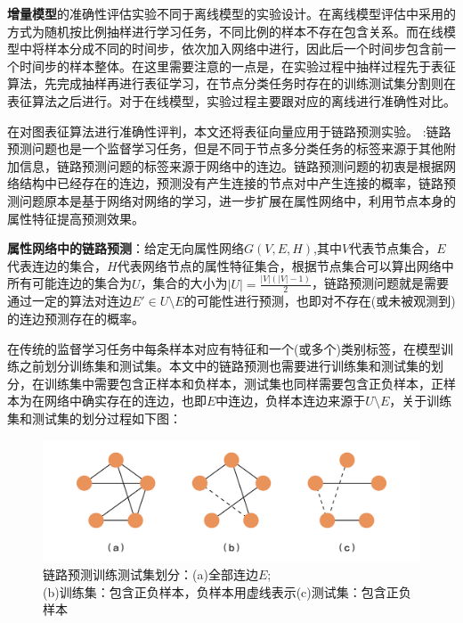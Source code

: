 \textbf{增量模型}的准确性评估实验不同于离线模型的实验设计。在离线模型评估中采用的方式为随机按比例抽样进行学习任务，不同比例的样本不存在包含关系。而在线模型中将样本分成不同的时间步，依次加入网络中进行，因此后一个时间步包含前一个时间步的样本整体。在这里需要注意的一点是，在实验过程中抽样过程先于表征算法，先完成抽样再进行表征学习，在节点分类任务时存在的训练测试集分割则在表征算法之后进行。对于在线模型，实验过程主要跟对应的离线进行准确性对比。

在对图表征算法进行准确性评判，本文还将表征向量应用于链路预测实验。
:链路预测问题也是一个监督学习任务，但是不同于节点多分类任务的标签来源于其他附加信息，链路预测问题的标签来源于网络中的连边。链路预测问题的初衷是根据网络结构中已经存在的连边，预测没有产生连接的节点对中产生连接的概率，链路预测问题原本是基于网络对网络的学习，进一步扩展在属性网络中，利用节点本身的属性特征提高预测效果。

\textbf{属性网络中的链路预测}：给定无向属性网络$G(V,E,H)$,其中$V$代表节点集合，$E$代表连边的集合，$H$代表网络节点的属性特征集合，根据节点集合可以算出网络中所有可能连边的集合为$U$，集合的大小为$|U| = \frac{|V|(|V|-1)}{2}$，链路预测问题就是需要通过一定的算法对连边$E\prime\in U\setminus E$的可能性进行预测，也即对不存在(或未被观测到)的连边预测存在的概率。

在传统的监督学习任务中每条样本对应有特征和一个(或多个)类别标签，在模型训练之前划分训练集和测试集。本文中的链路预测也需要进行训练集和测试集的划分，在训练集中需要包含正样本和负样本，测试集也同样需要包含正负样本，正样本为在网络中确实存在的连边，也即$E$中连边，负样本连边来源于$U\setminus E$，关于训练集和测试集的划分过程如下图：
\begin{figure}
	\centering
	\includegraphics[width=5in]{figures/link_prediction_split}
	\caption{链路预测训练测试集划分：(a)全部连边$E$;\\(b)训练集：包含正负样本，负样本用虚线表示(c)测试集：包含正负样本}
\end{figure}

